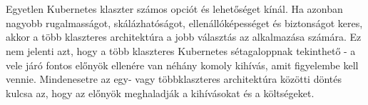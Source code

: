 \chapter{\summary}
Egyetlen Kubernetes klaszter számos opciót és lehetőséget kínál. Ha azonban nagyobb
rugalmasságot, skálázhatóságot, ellenállóképességet és biztonságot keres, akkor a több klaszteres architektúra a jobb választás az alkalmazása számára.
Ez nem jelenti azt, hogy a több klaszteres Kubernetes sétagaloppnak tekinthető - a vele járó fontos előnyök ellenére van néhány komoly kihívás, amit figyelembe kell vennie. Mindenesetre az egy- vagy többklaszteres architektúra közötti döntés kulcsa az, hogy az előnyök meghaladják a kihívásokat és a költségeket.